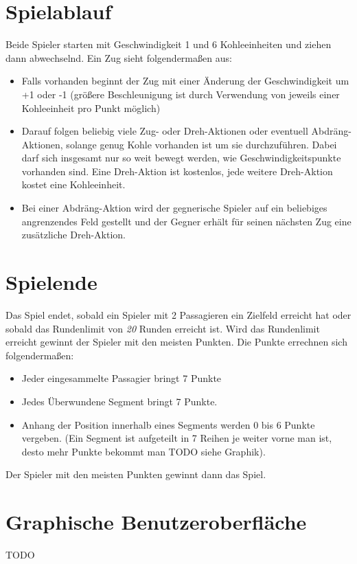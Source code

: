 \documentclass[12pt,a4paper, ngerman, oneside]{scrartcl}
\newcommand{\Rundenlimit}{\emph{20}}
\begin{document}
\section{Spielablauf}
Beide Spieler starten mit Geschwindigkeit 1 und 6 Kohleeinheiten und ziehen dann abwechselnd. Ein Zug sieht folgendermaßen aus:
\begin{itemize}
\item Falls vorhanden beginnt der Zug mit einer Änderung der Geschwindigkeit um +1 oder -1 (größere Beschleunigung ist durch Verwendung von jeweils einer Kohleeinheit pro Punkt möglich)
\item Darauf folgen beliebig viele Zug- oder Dreh-Aktionen oder eventuell Abdräng-Aktionen, solange genug Kohle vorhanden ist um sie durchzuführen. Dabei darf sich insgesamt nur so weit bewegt werden, wie Geschwindigkeitspunkte vorhanden sind. Eine Dreh-Aktion ist kostenlos, jede weitere Dreh-Aktion kostet eine Kohleeinheit.
\item Bei einer Abdräng-Aktion wird der gegnerische Spieler auf ein beliebiges angrenzendes Feld gestellt und der Gegner erhält für seinen nächsten Zug eine zusätzliche Dreh-Aktion.
\end{itemize} 
\section{Spielende}
Das Spiel endet, sobald ein Spieler mit 2 Passagieren ein Zielfeld erreicht hat oder sobald das Rundenlimit von \emph{\Rundenlimit} Runden erreicht ist. Wird das Rundenlimit erreicht gewinnt der Spieler mit den meisten Punkten. Die Punkte errechnen sich folgendermaßen:
\begin{itemize}
\item Jeder eingesammelte Passagier bringt 7 Punkte
\item Jedes Überwundene Segment bringt 7 Punkte. 
\item Anhang der Position innerhalb eines Segments werden 0 bis 6 Punkte vergeben. (Ein Segment ist aufgeteilt in 7 Reihen je weiter vorne man ist, desto mehr Punkte bekommt man TODO siehe Graphik).
\end{itemize}
Der Spieler mit den meisten Punkten gewinnt dann das Spiel.
\section{Graphische Benutzeroberfläche}
TODO
\end{document}
